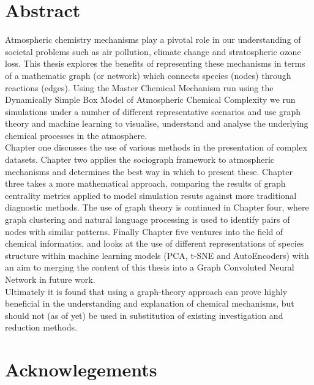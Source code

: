 \documentclass[twoside,openleft,reqno,a4paper,final]{book}
\begin{document}
\chapter*{Abstract}
\parbox{.75\textwidth}{
Atmospheric chemistry mechanisms play a pivotal role in our understanding of societal problems such as air pollution, climate change and stratospheric ozone loss. This thesis explores the benefits of representing these mechanisms in terms of a mathematic graph (or network) which connects species (nodes) through reactions (edges). Using the Master Chemical Mechanism run using the Dynamically Simple Box Model of Atmospheric Chemical Complexity we run simulations under a number of different representative scenarios and use graph theory and machine learning to visualise, understand and analyse the underlying chemical processes in the atmosphere.\\

Chapter one discusses the use of various methods in the presentation of complex datasets. Chapter two applies the sociograph framework to atmospheric mechanisms and determines the best way in which to present these. Chapter three takes a more mathematical approach, comparing the results of graph centrality metrics applied to model simulation resuts against more traditional diagnostic methods. The use of graph theory is continued in Chapter four, where graph clustering and natural language processing is used to identify pairs of nodes with similar patterns. Finally Chapter five ventures into the field of chemical informatics, and looks at the use of different representations of species structure within machine learning models (PCA, t-SNE and AutoEncoders) with an aim to merging the content of this thesis into a Graph Convoluted Neural Network in future work.\\

Ultimately it is found that using a graph-theory approach can prove highly beneficial in the understanding and explanation of chemical mechanisms, but should not (as of yet) be used in substitution of existing investigation and reduction methods.\\

}






    \chapter*{Acknowlegements}
\end{document}

